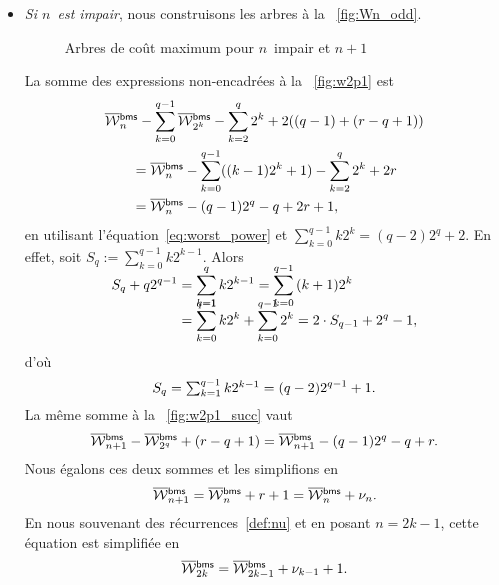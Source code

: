 \begin{itemize}
  \item \emph{Si \(n\)~est impair}, nous construisons les arbres à la
    \fig~\vref{fig:Wn_odd}.
\begin{figure}[t]
\centering
{}
\qquad
{} %
\caption{Arbres de coût maximum pour \(n\)~impair et \(n+1\)}
\label{fig:Wn_odd}
\end{figure}
    La somme des expressions non-encadrées à la \fig~\ref{fig:w2p1} est
    \begin{multline*}
      \OW{\fun{bms}}{n} - \sum_{k=0}^{q-1}\OW{\fun{bms}}{2^k} -
      \sum_{k=2}^{q}2^k + 2((q-1)+(r-q+1))\\
      \begin{aligned}
        & = \OW{\fun{bms}}{n} - \sum_{k=0}^{q-1}((k-1)2^{k}+1)
        - \sum_{k=2}^{q}2^k + 2r\\
        & = \OW{\fun{bms}}{n} - (q-1)2^q - q + 2r + 1,
      \end{aligned}
    \end{multline*}
    en utilisant l'équation~\eqref{eq:worst_power} et
    \(\sum_{k=0}^{q-1}k2^k = (q-2)2^{q}+2\). En effet, soit \(S_{q} :=
    \sum_{k=0}^{q-1}{k2^{k-1}}\). Alors
    \begin{align*}
      S_{q} + q2^{q-1} & = \smash[t]{\sum_{k=1}^{q}{k2^{k-1}}}
      = \smash[t]{\sum_{k=0}^{q-1}{(k+1)2^{k}}} \\
      & = \smash[t]{\sum_{k=0}^{q-1}{k2^{k}}} + \smash[t]{\sum_{k=0}^{q-1}{2^{k}}}
      = 2 \cdot S_{q-1} + 2^{q} - 1,
    \end{align*}
    d'où
    \begin{equation}
      \abovedisplayskip=4pt
      \belowdisplayskip=4pt
      S_{q} = \smash[t]{\textstyle\sum_{k=1}^{q-1}{k2^{k-1}}} =
      (q-2)2^{q-1} + 1.
      \label{eq:Sj}
    \end{equation}
    La même somme à la \fig~\ref{fig:w2p1_succ}
    vaut
    \begin{equation*}
      \OW{\fun{bms}}{n+1} - \OW{\fun{bms}}{2^q} + (r-q+1) =
      \OW{\fun{bms}}{n+1} - (q-1)2^{q} - q + r.
    \end{equation*}
    Nous égalons ces deux sommes et les simplifions en
    \begin{equation*}
      \OW{\fun{bms}}{n+1} = \OW{\fun{bms}}{n} + r + 1=
      \OW{\fun{bms}}{n} + \nu_n.
    \end{equation*}
    En nous souvenant des récurrences~\eqref{def:nu}  et
    en posant \(n=2k-1\), cette équation est simplifiée en
    \begin{equation}
      \OW{\fun{bms}}{2k} = \OW{\fun{bms}}{2k-1} + \nu_{k-1} + 1.
      \label{eq:OWbms_2k}
    \end{equation}

\end{itemize}
